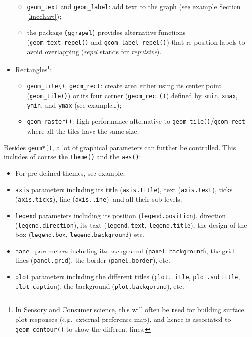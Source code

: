 \documentclass[
]{krantz}
\providecommand{\tightlist}{%
  \setlength{\itemsep}{0pt}\setlength{\parskip}{0pt}}
\begin{document}
\begin{itemize}
  \begin{itemize}
  \tightlist
  \item
    \texttt{geom\_text} and \texttt{geom\_label}: add text to the graph (see example Section \ref{linechart});
  \item
    the package \texttt{\{ggrepel\}} provides alternative functions (\texttt{geom\_text\_repel()} and \texttt{geom\_label\_repel()}) that re-position labels to avoid overlapping (\emph{repel} stands for \emph{repulsive}).
  \end{itemize}
\item
  Rectangles\footnote{In Sensory and Consumer science, this will often be used for building surface plot responses (e.g.~external preference map), and hence is associated to \texttt{geom\_contour()} to show the different lines.}:

  \begin{itemize}
  \tightlist
  \item
    \texttt{geom\_tile()}, \texttt{geom\_rect}: create area either using its center point (\texttt{geom\_tile()}) or its four corner (\texttt{geom\_rect()}) defined by \texttt{xmin}, \texttt{xmax}, \texttt{ymin}, and \texttt{ymax} (see example\ldots);
  \item
    \texttt{geom\_raster()}: high performance alternative to \texttt{geom\_tile()}/\texttt{geom\_rect} where all the tiles have the same size.
  \end{itemize}
\end{itemize}

Besides \texttt{geom*()}, a lot of graphical parameters can further be controlled. This includes of course the \texttt{theme()} and the \texttt{aes()}:

\begin{itemize}
\tightlist
\item
  For pre-defined themes, see example;
\item
  \texttt{axis} parameters including its title (\texttt{axis.title}), text (\texttt{axis.text}), ticks (\texttt{axis.ticks}), line (\texttt{axis.line}), and all their sub-levels.
\item
  \texttt{legend} parameters including its position (\texttt{legend.position}), direction (\texttt{legend.direction}), its text (\texttt{legend.text}, \texttt{legend.title}), the design of the box (\texttt{legend.box}, \texttt{legend.background}) etc.
\item
  \texttt{panel} parameters including its background (\texttt{panel.background}), the grid lines (\texttt{panel.grid}), the border (\texttt{panel.border}), etc.
\item
  \texttt{plot} parameters including the different titles (\texttt{plot.title}, \texttt{plot.subtitle}, \texttt{plot.caption}), the background (\texttt{plot.backgorund}), etc.
\end{itemize}
\end{document}
